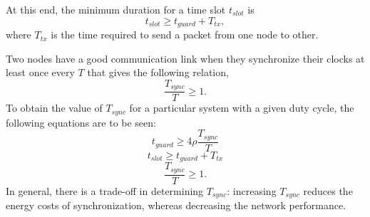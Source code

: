 \documentclass[journal]{IEEEtran}
\begin{document}
At this end, the minimum duration for a time slot $t_{slot}$ is
\begin{equation}
t_{slot} \geq t_{guard} + T_{tx},
\end{equation}
where $T_{tx}$ is the time required to send a packet from one node to other.
\par Two nodes have a good communication link when they synchronize
their clocks at least once every $T$ that gives the following
relation,
\begin{equation}
\frac{T_{sync}}{T}\geq 1.
\end{equation}
To obtain the value of $T_{sync}$ for a particular system with a given duty cycle, the following equations are to be seen:
\begin{equation}
t_{guard} \geq 4\rho \frac{T_{sync}}{T}
\end{equation}
\begin{equation}
t_{slot} \geq t_{guard} + T_{tx}
\end{equation}
\begin{equation}
\frac{T_{sync}}{T} \geq 1.
\end{equation}
In general, there is a trade-off in determining $T_{sync}$: increasing $T_{sync}$ reduces the energy costs of synchronization, whereas decreasing the network performance.
\end{document}
